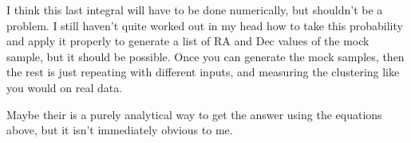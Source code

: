 \documentclass[11pt]{article}
\begin{document}
I think this last integral will have to be done numerically, but shouldn't be a problem.  I still haven't quite worked out in my head how to take this probability and apply it properly to generate a list of RA and Dec values of the mock sample, but it should be possible.  Once you can generate the mock samples, then the rest is just repeating with different inputs, and measuring the clustering like you would on real data.

Maybe their is a purely analytical way to get the answer using the equations above, but it isn't immediately obvious to me.

 
\end{document}

